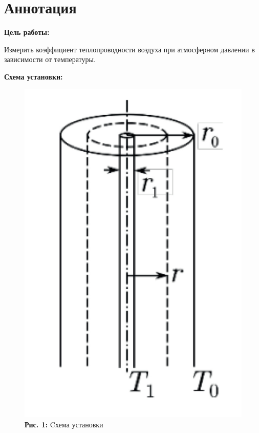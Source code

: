 \documentclass[12pt,a4paper]{scrartcl}
\begin{document}
	\section{Аннотация}
	
	\textbf{Цель работы: }
	
	Измерить коэффициент теплопроводности воздуха при атмосферном давлении в зависимости от температуры.
	
	\textbf{Схема установки:}
	\begin{center}
		\begin{figure}[h]
			\begin{minipage}{0.43\linewidth}
				\begin{center}
					\includegraphics[scale=0.127]{PIC_1.png}
					\\\textbf{Рис. 1:} Cхема установки

\end{center}
\end{minipage}
\end{figure}
\end{center}
\end{document}
